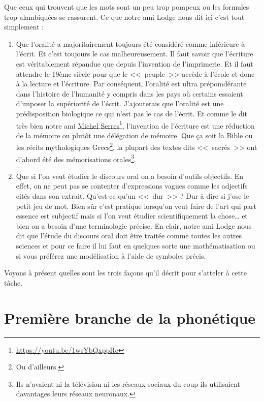 Que ceux qui trouvent que les mots sont un peu trop pompeux ou les
formules trop alambiquées se rassurent. Ce que notre ami Lodge nous
dit ici c'est tout simplement :
\begin{enumerate}
\item Que l'oralité a majoritairement toujours été considéré comme
  inférieure à l'écrit. Et c'est toujours le cas malheureusement. Il
  faut savoir que l'écriture est véritablement répandue que depuis
  l'invention de l'imprimerie. Et il faut attendre le 19ème siècle
  pour que le <<~peuple~>> accède à l'école et donc à la lecture et
  l'écriture. Par conséquent, l'oralité est ultra prépomdérante dans
  l'histoire de l'humanité y compris dans les pays où certains
  essaient d'imposer la supériorité de l'écrit. J'ajouterais que
  l'oralité est une prédisposition biologique ce qui n'est pas le cas
  de l'écrit. Et comme le dit très bien notre ami \href{https://youtu.be/1wsYbQxppRc}{Michel Serres}\footnote{\url{https://youtu.be/1wsYbQxppRc}},
  l'invention de l'écriture est une réduction de la mémoire ou plutôt
  une délégation de mémoire. Que ça soit la Bible ou les récits
  mythologiques Grecs\footnote{Ou d'ailleurs.}, la plupart des textes
  dits <<~sacrés~>> ont d'abord été des mémorisations
  orales\footnote{Ils n'avaient ni la télévision ni les réseaux
    sociaux du coup ils utilisaient davantages leurs réseaux
    neuronaux.}.
\item Que si l'on veut étudier le discours oral on a besoin d'outils
  objectifs. En effet, on ne peut pas se contenter d'expressions
  vagues comme les adjectifs cités dans son extrait. Qu'est-ce qu'un
  \son <<~dur~>> ? Dur à dire si j'ose le petit jeu de mot. Bien sûr
  c'est pratique lorsqu'on veut faire de l'art qui part essence est
  subjectif mais si l'on veut étudier scientifiquement la chose\dots{}
  et bien on a besoin d'une terminologie précise. En clair, notre ami
  Lodge nous dit que l'étude du discours oral doit être traitée comme
  toutes les autres sciences et pour ce faire il lui faut en quelques
  sorte une mathématisation ou si vous préférez une modélisation à
  l'aide de symboles précis.
\end{enumerate}

Voyons à présent quelles sont les trois façons qu'il décrit pour
s'atteler à cette tâche.

\newpage

\section{Première branche de la phonétique}\label{sec:phon-t1}

